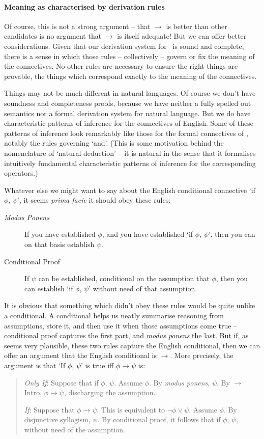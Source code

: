 \paragraph{Meaning as characterised by derivation rules}
Of course, this is not a strong argument – that $\to$ is better than other candidates is no argument that $\to$ is itself adequate! But we can offer better considerations. Given that our derivation system for \lone\ is sound and complete, there is a sense in which those rules – collectively – govern or fix the meaning of the connectives. No other rules are necessary to ensure the right things are provable, the things which correspond exactly to the meaning of the connectives.

Things may not be much different in natural languages. Of course we don't have soundness and completeness proofs, because we have neither a fully spelled out semantics nor a formal derivation system for natural language. But we do have characteristic patterns of inference for the connectives of English. Some of these patterns of inference look remarkably like those for the formal connectives of \lone, notably the rules governing `and'. (This is some motivation behind the nomenclature of `natural deduction' – it is natural in the sense that it formalises intuitively fundamental characteristic patterns of inference for the corresponding operators.)

Whatever else we might want to say about the English conditional connective `if $\phi$, $\psi$', it seems \emph{prima facie} it should obey these rules: \begin{description}
	\item [\emph{Modus Ponens}]  If you have established $\phi$, and you have established  `if $\phi$, $\psi$', then you can on that basis establish $\psi$.
	\item [Conditional Proof] If $\psi$ can be established, conditional on the assumption that $\phi$, then you can establish `if $\phi$, $\psi$' without need of that assumption. 
\end{description}
It is obvious that something which didn't obey these rules would be quite unlike a conditional. A conditional helps us neatly summarise reasoning from assumptions, store it, and then use it when those assumptions come true – conditional proof captures the first part, and \emph{modus ponens} the last.
But if, as seems very plausible, these two rules capture the English conditional, then we can offer an argument that the English conditional is $\to$. More precisely, the argument is that ‘If $\phi$, $\psi$’ is true iff $\phi \to \psi$ is:  \begin{quote}
	\emph{Only If}: Suppose that if $\phi$, $\psi$. Assume $\phi$. By \emph{modus ponens}, $\psi$. By $\to$Intro, $\phi\to\psi$, discharging the assumption.

\emph{If}: Suppose that $\phi \to \psi$. This is equivalent to $\neg \phi \vee \psi$. Assume $\phi$. By disjunctive syllogism, $\psi$. By conditional proof, it follows that if $\phi$, $\psi$, without need of the assumption.
\end{quote}

